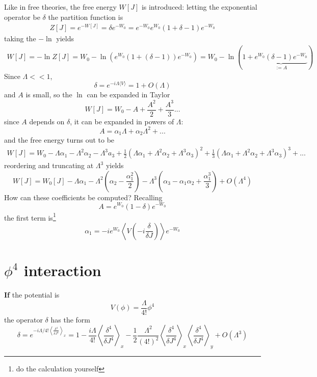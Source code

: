 Like in free theories, the free energy $W[J]$ is introduced: letting the
exponential operator be $\delta $ the partition function is
\begin{gather*}    
    Z[J]=e^{-W[J]} = \delta e^{-W_0} =
    e^{-W_0}e^{W_0}(1+\delta-1) e^{-W_0}
\end{gather*}
taking the $-\ln$ yields
\begin{gather*}
    W[J] = -\ln Z[J] = W_0-\ln\left(e^{W_0}(1+(\delta-1))e^{-W_0}\right)=
    W_0-\ln\left(1+\underbrace{e^{W_0}(\delta -1)e^{-W_0}}_{:=A}\right)
\end{gather*}
Since $\Lambda <<1$,
\[
    \delta =e^{-i\Lambda \langle V\rangle } = 1+O(\Lambda)
\]
and $A$ is small, so the $\ln$ can be expanded in Taylor
\[
    W[J]=W_0 - A+\frac{A^2}{2}+\frac{A^3}{3}...
\]
since $A$ depends on $\delta $, it can be expanded in powers of $\Lambda $:
\[
    A=\alpha _1\Lambda +\alpha _2\Lambda ^2+...
\]
and the free energy turns out to be
\begin{gather*}
    W[J]=W_0 - \Lambda \alpha _1-\Lambda ^2\alpha _2-\Lambda ^3a_3+
    \frac{1}{2}\left(\Lambda \alpha _1+\Lambda^2\alpha _2+\Lambda ^3\alpha _3
    \right)^2+
    \frac{1}{3}\left(\Lambda \alpha _1+\Lambda^2\alpha _2+\Lambda ^3\alpha _3
    \right)^3+...
\end{gather*}
reordering and truncating at $\Lambda ^3 $ yields
\[
    W[J]=W_0[J]-\Lambda \alpha _1-\Lambda ^2\left(\alpha _2-\frac{\alpha _1^2}{2}
    \right)-\Lambda ^3\left(\alpha _3 - \alpha _1\alpha _2+\frac{\alpha_1^3}{3}
    \right) + O(\Lambda^4)
\]
How can these coefficients be computed? Recalling
\[
    A=e^{W_0}(1-\delta)e^{-W_0}
\]
the first term is\footnote{do the calculation yourself}
\[
    \alpha _1 = -ie^{W_0}\left\langle{V\left(-i\frac{\delta }{\delta J}\right)}
    \right\rangle e^{-W_0}
\]
\section{$\phi^4$ interaction}

\textbf{If} the potential is
\[
    V(\phi) = \frac{\Lambda }{4!}\phi ^4
\]
the operator $\delta$ has the form
\[
    \delta = e^{-i\Lambda/4! \left\langle \frac{\delta^4}{\delta J^4}
    \right\rangle_x }=1-\frac{i\Lambda}{4!} \left\langle \frac{\delta^4}
    {\delta J ^4}\right\rangle_x
    -\frac{1}{2}\frac{\Lambda ^2}{(4!)^2}\left\langle \frac{\delta^4}
    {\delta J ^4}\right\rangle_x\left\langle \frac{\delta^4}{\delta J ^4}
    \right\rangle_y+O(\Lambda^3)
\]
